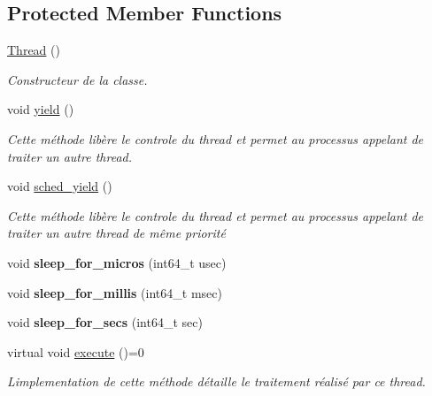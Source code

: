 \subsection*{Protected Member Functions}
\begin{DoxyCompactItemize}
\item 
\mbox{\label{classutils_1_1Thread_a37ac9e17f8e0f6e29541278ede555465}} 
\hyperlink{classutils_1_1Thread_a37ac9e17f8e0f6e29541278ede555465}{Thread} ()
\begin{DoxyCompactList}\small\item\em Constructeur de la classe. \end{DoxyCompactList}\item 
void \hyperlink{classutils_1_1Thread_a2535cf3474384aad6621c0556813097f}{yield} ()
\begin{DoxyCompactList}\small\item\em Cette méthode libère le controle du thread et permet au processus appelant de traiter un autre thread. \end{DoxyCompactList}\item 
void \hyperlink{classutils_1_1Thread_a540314edf56707d4f8732af3be6d7044}{sched\+\_\+yield} ()
\begin{DoxyCompactList}\small\item\em Cette méthode libère le controle du thread et permet au processus appelant de traiter un autre thread de même priorité \end{DoxyCompactList}\item 
\mbox{\label{classutils_1_1Thread_ad5bc89ff373a37499d1bf12d9624f964}} 
void {\bfseries sleep\+\_\+for\+\_\+micros} (int64\+\_\+t usec)
\item 
\mbox{\label{classutils_1_1Thread_abf0fce52d68ec9df1bd813c8b9e50da6}} 
void {\bfseries sleep\+\_\+for\+\_\+millis} (int64\+\_\+t msec)
\item 
\mbox{\label{classutils_1_1Thread_ae98681ec5fca60939f1a5daff44bcc67}} 
void {\bfseries sleep\+\_\+for\+\_\+secs} (int64\+\_\+t sec)
\item 
\mbox{\label{classutils_1_1Thread_a202b3fabad41b3be6d996043b262a43a}} 
virtual void \hyperlink{classutils_1_1Thread_a202b3fabad41b3be6d996043b262a43a}{execute} ()=0
\begin{DoxyCompactList}\small\item\em L\textquotesingle{}implementation de cette méthode détaille le traitement réalisé par ce thread. \end{DoxyCompactList}\end{DoxyCompactItemize}
